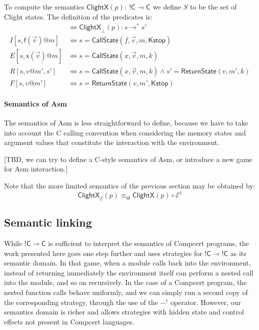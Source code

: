 \documentclass[sigplan,10pt,review,anonymous]{acmart}
\makeatletter
\newcommand{\kw}[1]{\ensuremath{ \textsf{#1} }}
\newcommand{\EC}{\kw{C}}
\newcommand{\mcall}[3]{\kw{#1}({#2})@{#3}}
\newcommand{\pcall}[3]{%
  \underline{\mcall{#1}{#2}{#3}}%
}
\newcommand{\mret}[2]{{#1}@{#2}}
\newcommand{\pret}[2]{%
  \underline{\mret{#1}{#2}}%
}
\makeatother
\begin{document}
To compute the semantics $\kw{ClightX}(p) : \: !\EC \multimap \EC$
we define $S$ to be the set of Clight states.
The definition of the predicates is:
\begin{align*}
  [s \Rightarrow s'] &\Leftrightarrow
    \kw{ClightX}_\bot(p) : s \rightarrow^* s' \\
  I[s, \mcall{f}{\vec{v}}{m}] &\Leftrightarrow
    s = \kw{CallState}(f, \vec{v}, m, \kw{Kstop}) \\
  E[s, \pcall{x}{\vec{v}}{m}] &\Leftrightarrow
    s = \kw{CallState}(x, \vec{v}, m, k) \\
  R[s, \mret{v}{m'}, s'] &\Leftrightarrow
    s = \kw{CallState}(x, \vec{v}, m, k) \wedge
    s' = \kw{ReturnState}(v, m', k) \\
  F[s, \pret{v}{m'}] &\Leftrightarrow
    s = \kw{ReturnState}(v, m', \kw{Kstop})
\end{align*}


\paragraph{Semantics of Asm} %

The semantics of Asm is less straightforward to define,
because we have to take into account the C calling convention
when considering the memory states and argument values
that constitute the interaction with the environment.

[TBD, we can try to define a C-style semantics of Asm,
or introduce a new game for Asm interaction.]


Note that the more limited semantics of the previous section
may be obtained by:
\[ \kw{ClightX}_\mathcal{E}(p) \equiv_\kw{id} \kw{ClightX}(p) \circ \mathcal{E}^\dagger \]


\subsection{Semantic linking} %

While ${!\EC} \multimap \EC$ is sufficient
to interpret the semantics of Compcert programs,
the work presented here goes one step further
and uses strategies for ${!\EC} \multimap {!\EC}$
as its semantic domain.
In that game,
when a module calls back into the environment,
instead of returning immediately
the environment itself
can perform a nested call into the module,
and so on recursively.
In the case of a Compcert program,
the nested function calls behave uniformly,
and we can simply run a second copy of
the corresponding strategy,
through the use of the $-^\dagger$ operator.
However,
our semantics domain is richer
and allows strategies with hidden state
and control effects
not present in Compcert languages.
\end{document}
